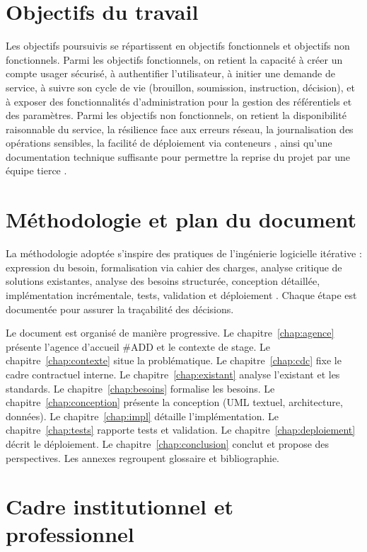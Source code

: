 \section{Objectifs du travail}

Les objectifs poursuivis se répartissent en objectifs fonctionnels et objectifs non fonctionnels. Parmi les objectifs fonctionnels, on retient la capacité à créer un compte usager sécurisé, à authentifier l'utilisateur, à initier une demande de service, à suivre son cycle de vie (brouillon, soumission, instruction, décision), et à exposer des fonctionnalités d'administration pour la gestion des référentiels et des paramètres. Parmi les objectifs non fonctionnels, on retient la disponibilité raisonnable du service, la résilience face aux erreurs réseau, la journalisation des opérations sensibles, la facilité de déploiement via conteneurs \cite{dockerdoc}, ainsi qu'une documentation technique suffisante pour permettre la reprise du projet par une équipe tierce \cite{pressman2014}.

\newpage
\section{Méthodologie et plan du document}

La méthodologie adoptée s'inspire des pratiques de l'ingénierie logicielle itérative : expression du besoin, formalisation via cahier des charges, analyse critique de solutions existantes, analyse des besoins structurée, conception détaillée, implémentation incrémentale, tests, validation et déploiement \cite{sommerville2016}. Chaque étape est documentée pour assurer la traçabilité des décisions.

Le document est organisé de manière progressive. Le chapitre~\ref{chap:agence} présente l'agence d'accueil \#ADD et le contexte de stage. Le chapitre~\ref{chap:contexte} situe la problématique. Le chapitre~\ref{chap:cdc} fixe le cadre contractuel interne. Le chapitre~\ref{chap:existant} analyse l'existant et les standards. Le chapitre~\ref{chap:besoins} formalise les besoins. Le chapitre~\ref{chap:conception} présente la conception (UML textuel, architecture, données). Le chapitre~\ref{chap:impl} détaille l'implémentation. Le chapitre~\ref{chap:tests} rapporte tests et validation. Le chapitre~\ref{chap:deploiement} décrit le déploiement. Le chapitre~\ref{chap:conclusion} conclut et propose des perspectives. Les annexes regroupent glossaire et bibliographie.

\section{Cadre institutionnel et professionnel}


